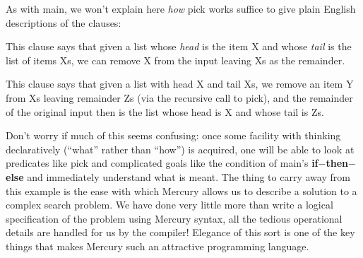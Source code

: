 \documentclass[a4paper,11pt,notitlepage,onecolumn]{book}
\begin{document}
As with \textsf{main}, we won't explain here \emph{how} \textsf{pick} works suffice to
give plain English descriptions of the clauses:
\begin{small}

\begin{ptabular}
\nextline
\end{ptabular}

\end{small}
This clause says that given a list whose \emph{head} is the item \textsf{X} and
whose \emph{tail} is the list of items \textsf{Xs}, we can remove \textsf{X} from the
input leaving \textsf{Xs} as the remainder.
\begin{small}

\begin{ptabular}
\nextline
\end{ptabular}

\end{small}
This clause says that given a list with head \textsf{X} and tail \textsf{Xs}, we remove an
item \textsf{Y} from \textsf{Xs} leaving remainder \textsf{Zs} (via the recursive call to
\textsf{pick}), and the remainder of the original input then is the list whose head
is \textsf{X} and whose tail is \textsf{Zs}.

Don't worry if much of this seems confusing: once some facility with
thinking declaratively (\ie ``what'' rather than ``how'') is acquired, one
will be able to look at predicates like \textsf{pick} and complicated goals like
the condition of \textsf{main}'s \textsf{\textbf{if}{\ensuremath{-}}\textbf{then}{\ensuremath{-}}\textbf{else}} and immediately understand what is
meant.  The thing to carry away from this example is the ease with which
Mercury allows us to describe a solution to a complex search problem.  We
have done very little more than write a logical specification of the problem
using Mercury syntax, all the tedious operational details are handled for us
by the compiler!  Elegance of this sort is one of the key things that makes
Mercury such an attractive programming language.
\end{document}
